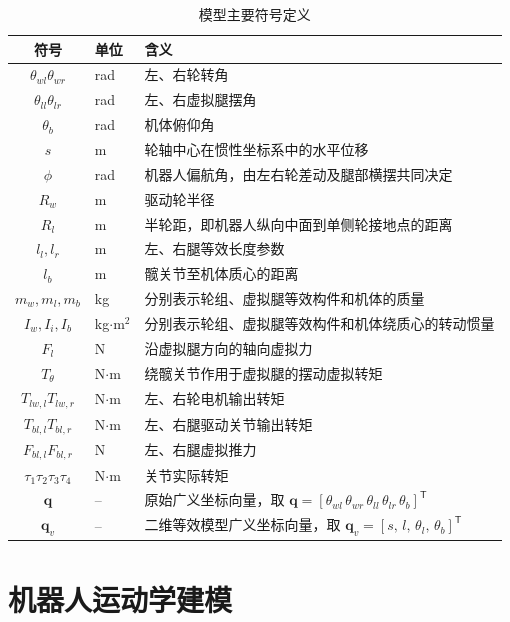 \begin{table}[H]
  \centering
  \caption{模型主要符号定义}\label{tab:model-symbols}
  \renewcommand{\arraystretch}{1.25}
  \begin{tabular}{@{}clp{8.2cm}@{}}
    \toprule
    符号 & 单位 & 含义 \\
    \midrule
    $\theta_{wl} \theta_{wr}$ & rad & 左、右轮转角 \\
    $\theta_{ll} \theta_{lr}$ & rad & 左、右虚拟腿摆角 \\
    $\theta_b$ & rad & 机体俯仰角 \\
    $s$ & m & 轮轴中心在惯性坐标系中的水平位移 \\
    $\phi$ & rad & 机器人偏航角，由左右轮差动及腿部横摆共同决定 \\
    $R_w$ & m & 驱动轮半径 \\
    $R_l$ & m & 半轮距，即机器人纵向中面到单侧轮接地点的距离 \\
    $l_l, l_r$ & m & 左、右腿等效长度参数\\
    $l_b$ & m & 髋关节至机体质心的距离 \\
    $m_w, m_l, m_b$ & kg & 分别表示轮组、虚拟腿等效构件和机体的质量 \\
    $I_w, I_i, I_b$ & kg$\cdot$m$^2$ & 分别表示轮组、虚拟腿等效构件和机体绕质心的转动惯量 \\
    $F_l$ & N & 沿虚拟腿方向的轴向虚拟力 \\
    $T_\theta$ & N$\cdot$m & 绕髋关节作用于虚拟腿的摆动虚拟转矩 \\
    $T_{lw,l} T_{lw,r}$ & N$\cdot$m & 左、右轮电机输出转矩 \\
    $T_{bl,l} T_{bl,r}$ & N$\cdot$m & 左、右腿驱动关节输出转矩 \\
    $F_{bl,l} F_{bl,r}$ & N & 左、右腿虚拟推力 \\
    $\tau_1 \tau_2 \tau_3  \tau_4$ & N$\cdot$m & 关节实际转矩 \\
    $\boldsymbol{q}$ & -- & 原始广义坐标向量，取 $\boldsymbol{q} = [\theta_{wl}\, \theta_{wr}\, \theta_{ll}\, \theta_{lr}\, \theta_b]^\mathsf{T}$ \\
    $\boldsymbol{q}_v$ & -- & 二维等效模型广义坐标向量，取 $\boldsymbol{q}_v = [s,\, l,\, \theta_l,\, \theta_b]^\mathsf{T}$ \\
    \bottomrule
  \end{tabular}
\end{table}

\section{机器人运动学建模}

